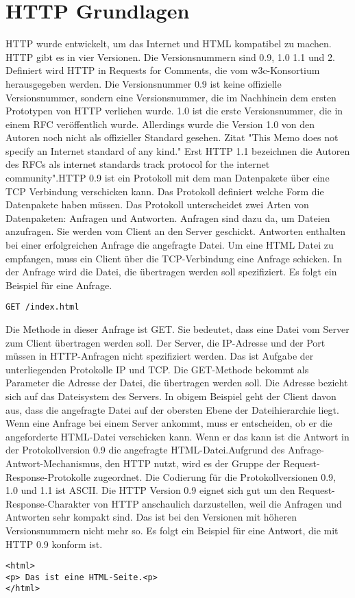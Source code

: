 \documentclass{llncs}
\begin{document}
\section{HTTP Grundlagen}
HTTP wurde entwickelt, um das Internet und HTML kompatibel zu machen. HTTP gibt es in vier Versionen. Die Versionsnummern sind 0.9, 1.0 1.1 und 2. Definiert wird HTTP in Requests for Comments, die vom w3c-Konsortium herausgegeben werden. Die Versionsnummer 0.9 ist keine offizielle Versionsnummer, sondern eine Versionsnummer, die im Nachhinein dem ersten Prototypen von HTTP verliehen wurde. 1.0 ist die erste Versionsnummer, die in einem RFC veröffentlich wurde. Allerdings wurde die Version 1.0 von den Autoren noch nicht als offizieller Standard gesehen. Zitat "This Memo does not specify an Internet standard of any kind." Erst HTTP 1.1 bezeichnen die Autoren des RFCs als internet standards track protocol for the internet community".\newline HTTP 0.9 ist ein Protokoll mit dem man Datenpakete über eine TCP Verbindung verschicken kann. Das Protokoll definiert welche Form die Datenpakete haben müssen. Das Protokoll unterscheidet zwei Arten von Datenpaketen: Anfragen und Antworten. Anfragen sind dazu da, um Dateien anzufragen. Sie werden vom Client an den Server geschickt. Antworten enthalten bei einer erfolgreichen Anfrage die angefragte Datei. Um eine HTML Datei zu empfangen, muss ein Client über die TCP-Verbindung eine Anfrage schicken. In der Anfrage wird die Datei, die übertragen werden soll spezifiziert. Es folgt ein Beispiel für eine Anfrage.
\begin{verbatim}
GET /index.html
\end{verbatim}
Die Methode in dieser Anfrage ist GET. Sie bedeutet, dass eine Datei vom Server zum Client übertragen werden soll. Der Server, die IP-Adresse und der Port müssen in HTTP-Anfragen nicht spezifiziert werden. Das ist Aufgabe der unterliegenden Protokolle IP und TCP. Die GET-Methode bekommt als Parameter die Adresse der Datei, die übertragen werden soll. Die Adresse bezieht sich auf das Dateisystem des Servers. In obigem Beispiel geht der Client davon aus, dass die angefragte Datei auf der obersten Ebene der Dateihierarchie liegt.\newline
Wenn eine Anfrage bei einem Server ankommt, muss er entscheiden, ob er die angeforderte HTML-Datei verschicken kann. Wenn er das kann ist die Antwort in der Protokollversion 0.9 die angefragte HTML-Datei.Aufgrund des Anfrage-Antwort-Mechanismus, den HTTP nutzt, wird es der Gruppe der Request-Response-Protokolle zugeordnet. Die Codierung für die Protokollversionen 0.9, 1.0 und 1.1 ist ASCII. Die HTTP Version 0.9 eignet sich gut um den Request-Response-Charakter von HTTP anschaulich darzustellen, weil die Anfragen und Antworten sehr kompakt sind. Das ist bei den Versionen mit höheren Versionsnummern nicht mehr so. Es folgt ein Beispiel für eine Antwort, die mit HTTP 0.9 konform ist.
\begin{verbatim}
<html>
<p> Das ist eine HTML-Seite.<p>
</html>
\end{verbatim}
\end{document}
